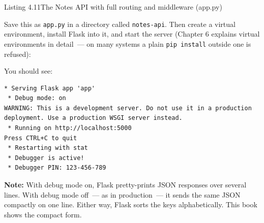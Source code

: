 \begin{codeboxcap}{\textcolor{accent}{Listing 4.11}\enspace The Notes API with full routing and middleware (app.py)}
\begin{Shaded}
\begin{Highlighting}[]

  \OperatorTok{==} \NormalTok{:}
\OperatorTok{=}\OperatorTok{=}\OperatorTok{=}\NormalTok{)}
\end{Highlighting}
\end{Shaded}

\end{codeboxcap}

\noindent{}Save this as \texttt{app.py} in a directory called \texttt{notes-api}. Then create a virtual environment, install Flask into it, and start the server (Chapter 6 explains virtual environments in detail~--- on many systems a plain \texttt{pip\ install} outside one is refused):

\begin{codebox}[short]

\begin{Shaded}
\begin{Highlighting}[]
 
\end{Highlighting}
\end{Shaded}

\end{codebox}

\noindent{}You should see:

\begin{outputbox}[short]
\begin{Verbatim}[fontsize=\codesize, breaklines, breakanywhere, breaksymbolleft={\tiny\textcolor{muted}{$\hookrightarrow$}}]
 * Serving Flask app 'app'
 * Debug mode: on
WARNING: This is a development server. Do not use it in a production deployment. Use a production WSGI server instead.
 * Running on http://localhost:5000
Press CTRL+C to quit
 * Restarting with stat
 * Debugger is active!
 * Debugger PIN: 123-456-789
\end{Verbatim}
\end{outputbox}

\begin{notebox}

\textbf{Note:} With debug mode on, Flask pretty-prints JSON responses over several lines. With debug mode off~--- as in production~--- it sends the same JSON compactly on one line. Either way, Flask sorts the keys alphabetically. This book shows the compact form.

\end{notebox}

